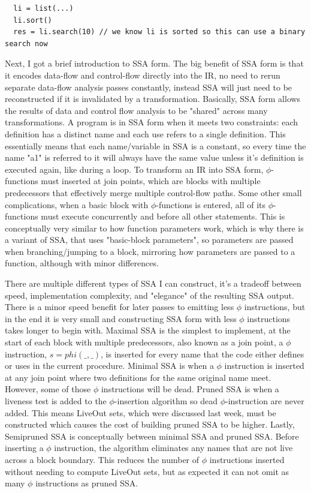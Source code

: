 \documentclass[11pt, a4paper, titlepage]{article}
\begin{document}
\begin{lstlisting}
  li = list(...)
  li.sort()
  res = li.search(10) // we know li is sorted so this can use a binary search now
\end{lstlisting}

Next, I got a brief introduction to SSA form.
The big benefit of SSA form is that it encodes data-flow and control-flow directly into the IR,
no need to rerun separate data-flow analysis passes constantly, instead SSA will just need to be reconstructed if it is invalidated by a transformation.
Basically, SSA form allows the results of data and control flow analysis to be "shared" across many transformations.
A program is in SSA form when it meets two constraints: each definition has a distinct name and each use refers to a single definition.
This essentially means that each name/variable in SSA is a constant, so every time the name "a1" is referred to it will always have the same value unless it's definition is executed again, like during a loop.
To transform an IR into SSA form, $\phi$-functions must inserted at join points, which are blocks with multiple predecessors that effectively merge multiple control-flow paths.
Some other small complications, when a basic block with $\phi$-functions is entered, all of its $\phi$-functions must execute concurrently and before all other statements.
This is conceptually very similar to how function parameters work, which is why there is a variant of SSA, that uses "basic-block parameters", so parameters are passed when branching/jumping to a block,
mirroring how parameters are passed to a function, although with minor differences.

There are multiple different types of SSA I can construct, it's a tradeoff between speed,
implementation complexity, and "elegance" of the resulting SSA output.
There is a minor speed benefit for later passes to emitting less $\phi$ instructions, but in the end it is very small and constructing SSA form with less $\phi$ instructions takes longer to begin with.
Maximal SSA is the simplest to implement, at the start of each block with multiple predecessors, also known as a join point, a $\phi$ instruction,
$s = phi(\_,\_)$, is inserted for every name that the code either defines or uses in the current procedure.
Minimal SSA is when a $\phi$ instruction is inserted at any join point where two definitions for the same original name meet.
However, some of those $\phi$ instructions will be dead.
Pruned SSA is when a liveness test is added to the $\phi$-insertion algorithm so dead $\phi$-instruction are never added.
This means LiveOut sets, which were discussed last week, must be constructed which causes the cost of building pruned SSA to be higher.
Lastly, Semipruned SSA is conceptually between minimal SSA and pruned SSA.
Before inserting a $\phi$ instruction, the algorithm eliminates any names that are not live across a block boundary.
This reduces the number of $\phi$ instructions inserted without needing to compute LiveOut sets,
but as expected it can not omit as many $\phi$ instructions as pruned SSA.
\end{document}
